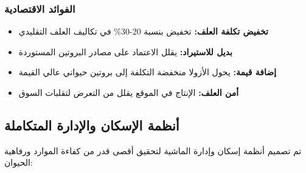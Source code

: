 \subsubsection{الفوائد الاقتصادية}
\begin{itemize}
    \item \textbf{تخفيض تكلفة العلف:} تخفيض بنسبة 20-30\% في تكاليف العلف التقليدي
    \item \textbf{بديل للاستيراد:} يقلل الاعتماد على مصادر البروتين المستوردة
    \item \textbf{إضافة قيمة:} يحول الأزولا منخفضة التكلفة إلى بروتين حيواني عالي القيمة
    \item \textbf{أمن العلف:} الإنتاج في الموقع يقلل من التعرض لتقلبات السوق
\end{itemize}

\subsection{أنظمة الإسكان والإدارة المتكاملة}

تم تصميم أنظمة إسكان وإدارة الماشية لتحقيق أقصى قدر من كفاءة الموارد ورفاهية الحيوان:


